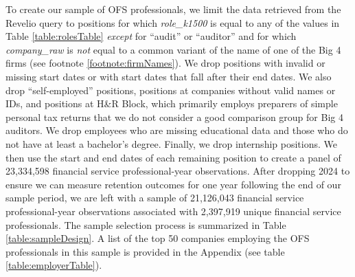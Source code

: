 \documentclass[11pt]{article}
\begin{document}
        To create our sample of OFS professionals, we limit the data retrieved from the Revelio query to positions for which \textit{role\_k1500} is equal to any of the values in Table \ref{table:rolesTable} \textit{except} for ``audit'' or ``auditor'' and for which \textit{company\_raw} is \textit{not} equal to a common variant of the name of one of the Big 4 firms (see footnote \ref{footnote:firmNames}). We drop positions with invalid or missing start dates or with start dates that fall after their end dates. We also drop ``self-employed'' positions, positions at companies without valid names or IDs, and positions at H\&R Block, which primarily employs preparers of simple personal tax returns that we do not consider a good comparison group for Big 4 auditors. We drop employees who are missing educational data and those who  do not have at least a bachelor's degree. Finally, we drop internship positions. We then use the start and end dates of each remaining position to create a panel of 23,334,598 financial service professional-year observations. After dropping 2024 to ensure we can measure retention outcomes for one year following the end of our sample period, we are left with a sample of 21,126,043 financial service professional-year observations associated with 2,397,919 unique financial service professionals. The sample selection process is summarized in Table \ref{table:sampleDesign}. A list of the top 50 companies employing the OFS professionals in this sample is provided in the Appendix (see table \ref{table:employerTable}).
\end{document}
